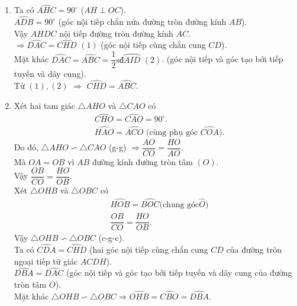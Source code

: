 \begin{bt}
{\begin{center}
\end{center}

\begin{enumerate}
	\item Ta có $\widehat{AHC}=90^\circ $ ($AH\perp OC$).\\
	$\widehat{ADB}=90^\circ $ (góc nội tiếp chắn nửa đường tròn đường kính $AB$).\\
	Vậy $ AHDC$ nội tiếp đường tròn đường kính $AC$.\\
	$\Rightarrow \widehat{DAC}=\widehat{CHD}$  \quad $(1)$ (góc nội tiếp cùng chắn cung $CD$).\\
	Mặt khác $\widehat{DAC}=\widehat{ABC}=\dfrac{1}{2}\text{sđ}\wideparen{AID}$ \quad $(2)$. (góc nội tiếp và góc tạo bởi tiếp tuyến và dây cung).\\
	Từ  $(1),(2)$ $\Rightarrow $ $\widehat{CHD}=\widehat{ABC}$.
	\item Xét hai tam giác $\triangle AHO$ và $ \triangle CAO$ có
	\begin{align*}
		&\widehat{CHO}=\widehat{CAO}=90^\circ.\\
		&\widehat{HAO}=\widehat{ACO} \text{ (cùng phụ góc } \widehat{COA}).
	\end{align*}
	Do đó, $\triangle AHO\backsim \triangle CAO$ (g-g) $\Rightarrow \dfrac{AO}{CO}=\dfrac{HO}{AO}$.\\
	Mà $OA=OB$ vì $AB$ đường kính đường tròn tâm $(O)$.\\
	Vậy $ \dfrac{OB}{CO}=\dfrac{HO}{OB}$.\\
	Xét $\triangle OHB$ và $\triangle OBC$ có
	\begin{align*}
	&\widehat{HOB}=\widehat{BOC} \text{(chung góc} \widehat{O})\\
	&\dfrac{OB}{CO}=\dfrac{HO}{OB}.
	\end{align*}
	Vậy $\triangle OHB\backsim \triangle OBC$ (c-g-c).\\
	Ta có $\widehat{CDA}=\widehat{CHD}$ (hai góc nội tiếp cùng chắn cung $CD$ của đường tròn ngoại tiếp tứ giác $ACDH$).\\
	$\widehat{DBA}=\widehat{DAC}$ (góc nội tiếp và góc tạo bởi tiếp tuyến và dây cung của đường tròn tâm $O$).\\
	Mặt khác $\triangle OHB\backsim \triangle OBC\Rightarrow \widehat{OHB}=\widehat{CBO}=\widehat{DBA}$.\\

\end{enumerate}}
\end{bt}
